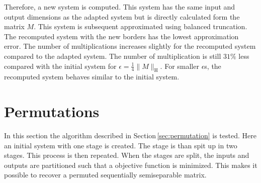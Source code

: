 \documentclass[doctype=mastersthesis,BCOR=15mm,biblatex]{ldvbook}%
\begin{document}
Therefore, a new system is computed. 
This system has the same input and output dimensions as the adapted system but is directly calculated form the matrix $M$.
This system is subsequent approximated using balanced truncation.
The recomputed system with the new borders has the lowest approximation error.
The number of multiplications increases slightly for the recomputed system compared to the adapted system.
The number of multiplication is still $31\%$ less compared with the initial system for $\epsilon = \frac{1}{4}\|M\|_\text{H}$.
For smaller $\epsilon$s,  the recomputed system behaves similar to the initial system.



\section{Permutations}\label{sec:test_perm}
In this section the algorithm described in Section\,\ref{sec:permutation} is tested.
Here an initial system with one stage is created.
The stage is than spit up in two stages.
This process is then repeated.
When the stages are split, the inputs and outputs are partitioned such that a objective function is minimized.
This makes it possible to recover a permuted sequentially semiseparable matrix.
\end{document}
